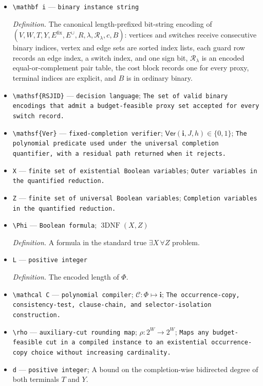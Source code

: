 \documentclass{article}
\begin{document}
\begin{itemize}
  \item \texttt{\textbackslash{}\allowbreak{}mathbf i} --- \texttt{binary instance string}
  \par\smallskip\noindent\emph{Definition.} The canonical length-prefixed bit-string encoding of \((V,W,T,Y,E^{\mathrm{fix}},E^{\cup},R,\lambda,\mathcal R_{\lambda},c,B)\): vertices and switches receive consecutive binary indices, vertex and edge sets are sorted index lists, each guard row records an edge index, a switch index, and one sign bit, \(\mathcal R_{\lambda}\) is an encoded equal-or-complement pair table, the cost block records one for every proxy, terminal indices are explicit, and \(B\) is in ordinary binary.
  \item \texttt{\textbackslash{}\allowbreak{}mathsf\{RSJID\}\allowbreak{}} --- \texttt{decision language}; \texttt{The set of valid binary encodings that admit a budget-\allowbreak{}feasible proxy set accepted for every switch record.}
  \item \texttt{\textbackslash{}\allowbreak{}mathsf\{Ver\}\allowbreak{}} --- \texttt{fixed-\allowbreak{}completion verifier}; \(\mathsf{Ver}(\mathbf i,J,h)\in\{0,1\}\); \texttt{The polynomial predicate used under the universal completion quantifier,\allowbreak{} with a residual path returned when it rejects.}
  \item \texttt{X} --- \texttt{finite set of existential Boolean variables}; \texttt{Outer variables in the quantified reduction.}
  \item \texttt{Z} --- \texttt{finite set of universal Boolean variables}; \texttt{Completion variables in the quantified reduction.}
  \item \texttt{\textbackslash{}\allowbreak{}Phi} --- \texttt{Boolean formula}; \(\operatorname{3DNF}(X,Z)\)
  \par\smallskip\noindent\emph{Definition.} A formula in the standard true \(\exists X\,\forall Z\) problem.
  \item \texttt{L} --- \texttt{positive integer}
  \par\smallskip\noindent\emph{Definition.} The encoded length of \(\Phi\).
  \item \texttt{\textbackslash{}\allowbreak{}mathcal C} --- \texttt{polynomial compiler}; \(\mathcal C:\Phi\mapsto\mathbf i\); \texttt{The occurrence-\allowbreak{}copy,\allowbreak{} consistency-\allowbreak{}test,\allowbreak{} clause-\allowbreak{}chain,\allowbreak{} and selector-\allowbreak{}isolation construction.}
  \item \texttt{\textbackslash{}\allowbreak{}rho} --- \texttt{auxiliary-\allowbreak{}cut rounding map}; \(\rho:2^W\to2^W\); \texttt{Maps any budget-\allowbreak{}feasible cut in a compiled instance to an existential occurrence-\allowbreak{}copy choice without increasing cardinality.}
  \item \texttt{d} --- \texttt{positive integer}; A bound on the completion-wise bidirected degree of both terminals \(T\) and \(Y\).
\end{itemize}
\end{document}
